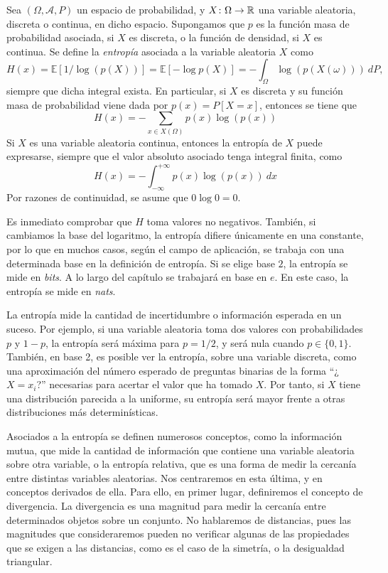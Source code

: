 \begin{definition}
    Sea $(\Omega, \mathcal{A},P)$ un espacio de probabilidad, y $X \colon \Omega \to \mathbb{R}$ una variable aleatoria, discreta o continua, en dicho espacio. Supongamos que $p$ es la función masa de probabilidad asociada, si $X$ es discreta, o la función de densidad, si $X$ es continua. Se define la \emph{entropía} asociada a la variable aleatoria $X$ como
    \[ H(x) = \mathbb{E}[1/\log(p(X))] = \mathbb{E}[-\log p(X) ] = - \int_{\Omega} \log(p(X(\omega)))\  d P, \]
    siempre que dicha integral exista. En particular, si $X$ es discreta y su función masa de probabilidad viene dada por $p(x) = P[X=x]$, entonces se tiene que
    \[ H(x) = -\sum_{x \in X(\Omega)} p(x)\log(p(x)) \]
    Si $X$ es una variable aleatoria continua, entonces la entropía de $X$ puede expresarse, siempre que el valor absoluto asociado tenga integral finita, como
    \[ H(x) = -\int_{-\infty}^{+\infty} p(x)\log(p(x))\ dx \]
    Por razones de continuidad, se asume que $0 \log 0 = 0$.
\end{definition}

Es inmediato comprobar que $H$ toma valores no negativos. También, si cambiamos la base del logaritmo, la entropía difiere únicamente en una constante, por lo que en muchos casos, según el campo de aplicación, se trabaja con una determinada base en la definición de entropía. Si se elige base $2$, la entropía se mide en \emph{bits}. A lo largo del capítulo se trabajará en base en $e$. En este caso, la entropía se mide en \emph{nats}.

La entropía mide la cantidad de incertidumbre o información esperada en un suceso. Por ejemplo, si una variable aleatoria toma dos valores con probabilidades $p$ y $1-p$, la entropía será máxima para $p = 1/2$, y será nula cuando $p \in \{0,1\}$. También, en base 2, es posible ver la entropía, sobre una variable discreta, como una aproximación del número esperado de preguntas binarias de la forma ``¿$X=x_i$?'' necesarias para acertar el valor que ha tomado $X$. Por tanto, si $X$ tiene una distribución parecida a la uniforme, su entropía será mayor frente a otras distribuciones más determinísticas.

Asociados a la entropía se definen numerosos conceptos, como la información mutua, que mide la cantidad de información que contiene una variable aleatoria sobre otra variable, o la entropía relativa, que es una forma de medir la cercanía entre distintas variables aleatorias. Nos centraremos en esta última, y en conceptos derivados de ella. Para ello, en primer lugar, definiremos el concepto de divergencia. La divergencia es una magnitud para medir la cercanía entre determinados objetos sobre un conjunto. No hablaremos de distancias, pues las magnitudes que consideraremos pueden no verificar algunas de las propiedades que se exigen a las distancias, como es el caso de la simetría, o la desigualdad triangular.


